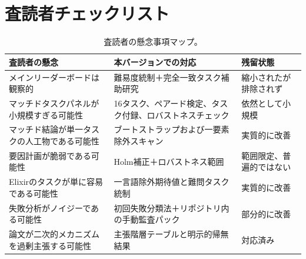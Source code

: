 \documentclass[11pt]{article}
\begin{document}
\section{査読者チェックリスト}

\begin{table}[H]
\centering
\caption{査読者の懸念事項マップ。}
\label{tab:reviewer}
\small
\begin{tabularx}{\textwidth}{>{\raggedright\arraybackslash}X >{\raggedright\arraybackslash}X >{\raggedright\arraybackslash}X}
\toprule
査読者の懸念 & 本バージョンでの対応 & 残留状態 \\
\midrule
メインリーダーボードは観察的 & 難易度統制＋完全一致タスク補助研究 & 縮小されたが排除されず \\
マッチドタスクパネルが小規模すぎる可能性 & 16タスク、ペアード検定、タスク付録、ロバストネスチェック & 依然として小規模 \\
マッチド結論が単一タスクの人工物である可能性 & ブートストラップおよび一要素除外スキャン & 実質的に改善 \\
要因計画が脆弱である可能性 & Holm補正＋ロバストネス範囲 & 範囲限定、普遍的ではない \\
Elixirのタスクが単に容易である可能性 & 一言語除外期待値と難問タスク統制 & 実質的に改善 \\
失敗分析がノイジーである可能性 & 初回失敗分類法＋リポジトリ内の手動監査パック & 部分的に改善 \\
論文が二次的メカニズムを過剰主張する可能性 & 主張階層テーブルと明示的帰無結果 & 対応済み \\
\bottomrule
\end{tabularx}
\end{table}
\end{document}
